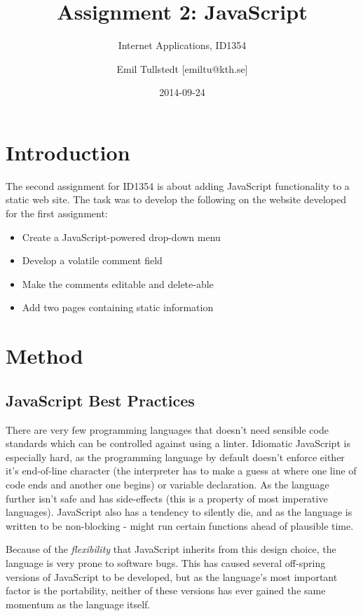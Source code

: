 \documentclass[a4paper]{scrartcl}
\title{Assignment 2: JavaScript}
\subtitle{Internet Applications, ID1354}
\author{Emil Tullstedt [emiltu@kth.se]}
\date{2014-09-24}
\begin{document}
\maketitle

\section{Introduction}

The second assignment for ID1354 is about adding JavaScript functionality to a static web site. The task was to develop the following on the website developed for the first assignment:

\begin{itemize}
\item Create a JavaScript-powered drop-down menu
\item Develop a volatile comment field
\item Make the comments editable and delete-able
\item Add two pages containing static information
\end{itemize}

\section{Method}

\subsection{JavaScript Best Practices}

There are very few programming languages that doesn't need sensible code standards which can be controlled against using a linter. Idiomatic JavaScript is especially hard, as the programming language by default doesn't enforce either it's end-of-line character (the interpreter has to make a guess at where one line of code ends and another one begins) or variable declaration. As the language further isn't safe and has side-effects (this is a property of most imperative languages). JavaScript also has a tendency to silently die, and as the language is written to be non-blocking - might run certain functions ahead of plausible time.

Because of the \textit{flexibility} that JavaScript inherits from this design choice, the language is very prone to software bugs. This has caused several off-spring versions of JavaScript to be developed, but as the language's most important factor is the portability, neither of these versions has ever gained the same momentum as the language itself.
\end{document}
